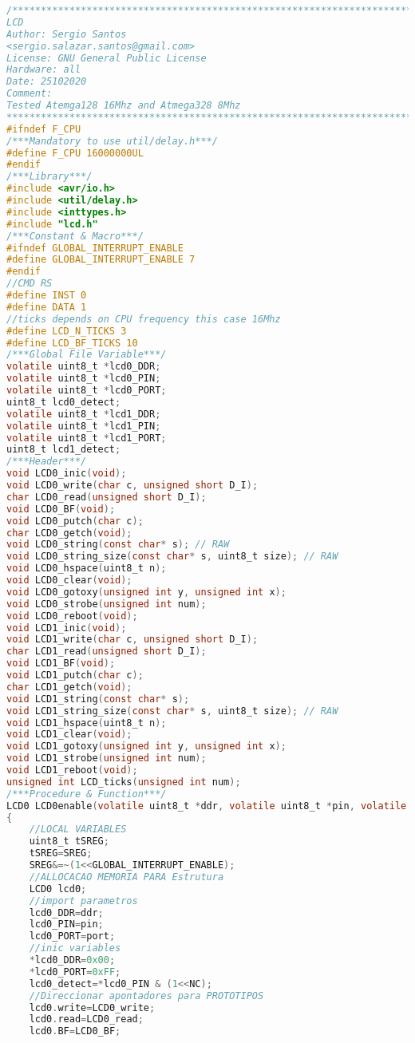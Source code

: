 \begin{lstlisting}[language=C, caption={lcd.c}, label=lcd-c, captionpos=b]
/*************************************************************************
LCD
Author: Sergio Santos 
<sergio.salazar.santos@gmail.com>
License: GNU General Public License
Hardware: all
Date: 25102020
Comment:
Tested Atemga128 16Mhz and Atmega328 8Mhz                    
************************************************************************/
#ifndef F_CPU
/***Mandatory to use util/delay.h***/
#define F_CPU 16000000UL
#endif
/***Library***/
#include <avr/io.h>
#include <util/delay.h>
#include <inttypes.h>
#include "lcd.h"
/***Constant & Macro***/
#ifndef GLOBAL_INTERRUPT_ENABLE
#define GLOBAL_INTERRUPT_ENABLE 7
#endif
//CMD RS
#define INST 0
#define DATA 1
//ticks depends on CPU frequency this case 16Mhz
#define LCD_N_TICKS 3
#define LCD_BF_TICKS 10
/***Global File Variable***/
volatile uint8_t *lcd0_DDR;
volatile uint8_t *lcd0_PIN;
volatile uint8_t *lcd0_PORT;
uint8_t lcd0_detect;
volatile uint8_t *lcd1_DDR;
volatile uint8_t *lcd1_PIN;
volatile uint8_t *lcd1_PORT;
uint8_t lcd1_detect;
/***Header***/
void LCD0_inic(void);
void LCD0_write(char c, unsigned short D_I);
char LCD0_read(unsigned short D_I);
void LCD0_BF(void);
void LCD0_putch(char c);
char LCD0_getch(void);
void LCD0_string(const char* s); // RAW
void LCD0_string_size(const char* s, uint8_t size); // RAW
void LCD0_hspace(uint8_t n);
void LCD0_clear(void);
void LCD0_gotoxy(unsigned int y, unsigned int x);
void LCD0_strobe(unsigned int num);
void LCD0_reboot(void);
void LCD1_inic(void);
void LCD1_write(char c, unsigned short D_I);
char LCD1_read(unsigned short D_I);
void LCD1_BF(void);
void LCD1_putch(char c);
char LCD1_getch(void);
void LCD1_string(const char* s);
void LCD1_string_size(const char* s, uint8_t size); // RAW
void LCD1_hspace(uint8_t n);
void LCD1_clear(void);
void LCD1_gotoxy(unsigned int y, unsigned int x);
void LCD1_strobe(unsigned int num);
void LCD1_reboot(void);
unsigned int LCD_ticks(unsigned int num);
/***Procedure & Function***/
LCD0 LCD0enable(volatile uint8_t *ddr, volatile uint8_t *pin, volatile uint8_t *port)
{
	//LOCAL VARIABLES
	uint8_t tSREG;
	tSREG=SREG;
	SREG&=~(1<<GLOBAL_INTERRUPT_ENABLE);
	//ALLOCACAO MEMORIA PARA Estrutura
	LCD0 lcd0;
	//import parametros
	lcd0_DDR=ddr;
	lcd0_PIN=pin;
	lcd0_PORT=port;
	//inic variables
	*lcd0_DDR=0x00;
	*lcd0_PORT=0xFF;
	lcd0_detect=*lcd0_PIN & (1<<NC);
	//Direccionar apontadores para PROTOTIPOS
	lcd0.write=LCD0_write;
	lcd0.read=LCD0_read;
	lcd0.BF=LCD0_BF;

\end{lstlisting}
